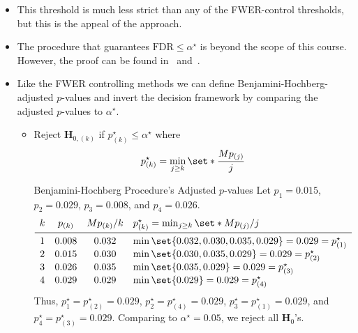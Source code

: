 \begin{itemize}
\begin{figure}[!htbp]
            \end{figure}
            \begin{Example}{Four-test Example --- Benjamini-Hochberg Procedure}{}
                  Let $ p_1=0.015 $, $ p_2=0.029 $, $ p_3=0.008 $, and $ p_4=0.026 $. Suppose that we wish to ensure
                  $ \FDR\le \alpha^\star=0.05 $. Since all $ p $-values fall below the purple line in~,
                  we reject all four null hypotheses.
            \end{Example}
      \item This threshold is much less strict than any of the FWER-control thresholds, but this is the appeal of
            the approach.
      \item The procedure that guarantees $ \text{FDR}\le \alpha^\star $ is beyond the scope of this course.
            However, the proof can be found in~\citet{benjamini} and~\citet{storey}.
      \item Like the FWER controlling methods we can define Benjamini-Hochberg-adjusted $p$-values and invert
            the decision framework by comparing the adjusted $ p $-values to $ \alpha^\star $.
            \begin{itemize}
                  \item Reject $ \mathbf{H}_{0,(k)} $ if $ p_{(k)}^\star\le \alpha^\star $ where
                        \[ p_{(k)}^\star=\min_{j\ge k}\set*{\frac{Mp_{(j)}}{j}} \]
                        \begin{Example}{Benjamini-Hochberg Procedure's Adjusted $ p $-values}{}
                              Let $ p_1=0.015 $, $ p_2=0.029 $, $ p_3=0.008 $, and $ p_4=0.026 $.
                              \[ \begin{array}{cccl}
                                          k & p_{(k)} & M p_{(k)}/k & p_{(k)}^\star=\min_{j\ge k}\set*{Mp_{(j)}/j}          \\
                                          \midrule
                                          1 & 0.008   & 0.032       & \min\set{0.032,0.030,0.035,0.029}=0.029=p_{(1)}^\star \\
                                          2 & 0.015   & 0.030       & \min\set{0.030,0.035,0.029}=0.029=p_{(2)}^\star       \\
                                          3 & 0.026   & 0.035       & \min\set{0.035,0.029}=0.029=p_{(3)}^\star             \\
                                          4 & 0.029   & 0.029       & \min\set{0.029}=0.029=p_{(4)}^\star
                                    \end{array} \]
                              Thus, $ p_1^\star=p_{(2)}^\star=0.029 $, $ p_2^\star=p_{(4)}^\star=0.029 $, $ p_3^\star=p_{(1)}^\star=0.029 $,
                              and $ p_4^\star=p_{(3)}^\star=0.029 $. Comparing to $ \alpha^\star=0.05 $,
                              we reject all $ \mathbf{H}_{0} $'s.
                        \end{Example}
            \end{itemize}
\end{itemize}
